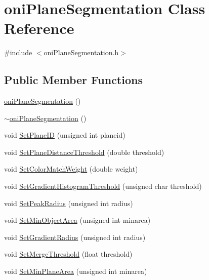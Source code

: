 \hypertarget{classoni_plane_segmentation}{}\section{oni\+Plane\+Segmentation Class Reference}
\label{classoni_plane_segmentation}


{\ttfamily \#include $<$oni\+Plane\+Segmentation.\+h$>$}

\subsection*{Public Member Functions}
\begin{DoxyCompactItemize}
\item 
\hyperlink{classoni_plane_segmentation_a4ace0243ee63fd42feeb32e67082467c}{oni\+Plane\+Segmentation} ()
\item 
\hyperlink{classoni_plane_segmentation_ad240c925a9d7548b0541a937a3d8323d}{$\sim$oni\+Plane\+Segmentation} ()
\item 
void \hyperlink{classoni_plane_segmentation_aebbb7db20ffabe9ff6af48c428209990}{Set\+Plane\+I\+D} (unsigned int planeid)
\item 
void \hyperlink{classoni_plane_segmentation_ab80b11a24ce72391f854de5c0d79ca43}{Set\+Plane\+Distance\+Threshold} (double threshold)
\item 
void \hyperlink{classoni_plane_segmentation_acbdfa1fd8645deb451fa0474afdc0bac}{Set\+Color\+Match\+Weight} (double weight)
\item 
void \hyperlink{classoni_plane_segmentation_ace19b996d053f44fe8f150972e3981d6}{Set\+Gradient\+Histogram\+Threshold} (unsigned char threshold)
\item 
void \hyperlink{classoni_plane_segmentation_a989b273d62d7dc593c734169792654eb}{Set\+Peak\+Radius} (unsigned int radius)
\item 
void \hyperlink{classoni_plane_segmentation_a8c7df0530ad97691de995d5472754eea}{Set\+Min\+Object\+Area} (unsigned int minarea)
\item 
void \hyperlink{classoni_plane_segmentation_af019daf8981643397c62f3320f7e25a8}{Set\+Gradient\+Radius} (unsigned int radius)
\item 
void \hyperlink{classoni_plane_segmentation_abd5af64008a7f24f2027a127af77c595}{Set\+Merge\+Threshold} (float threshold)
\item 
void \hyperlink{classoni_plane_segmentation_aaf0560f3c9e14c4c82fbde09a5868cae}{Set\+Min\+Plane\+Area} (unsigned int minarea)

\end{DoxyCompactItemize}
